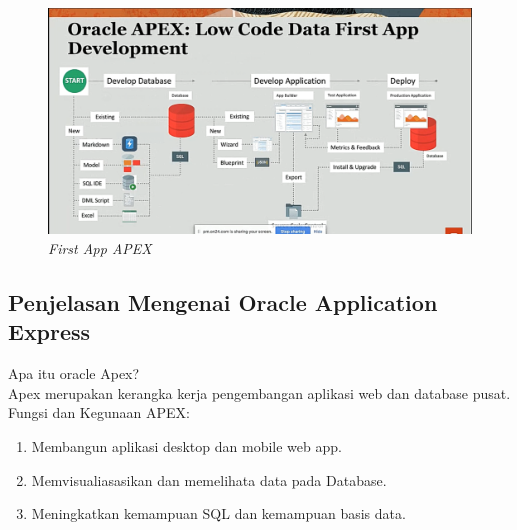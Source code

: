 \begin{figure}[H]
    \centering
    \includegraphics[scale=0.5]{figures/1}
    \caption{\textit{First App APEX}}
    \label{FirstApp}
\end{figure} 

\subsection{Penjelasan Mengenai Oracle Application Express}
Apa itu oracle Apex?\\
Apex merupakan kerangka kerja pengembangan aplikasi web dan database pusat.\\
Fungsi dan Kegunaan APEX:
\begin{enumerate}
 \item Membangun aplikasi desktop dan mobile web app.
 \item Memvisualiasasikan dan memelihata data pada Database.
 \item Meningkatkan kemampuan SQL dan kemampuan basis data.
\end{enumerate}

